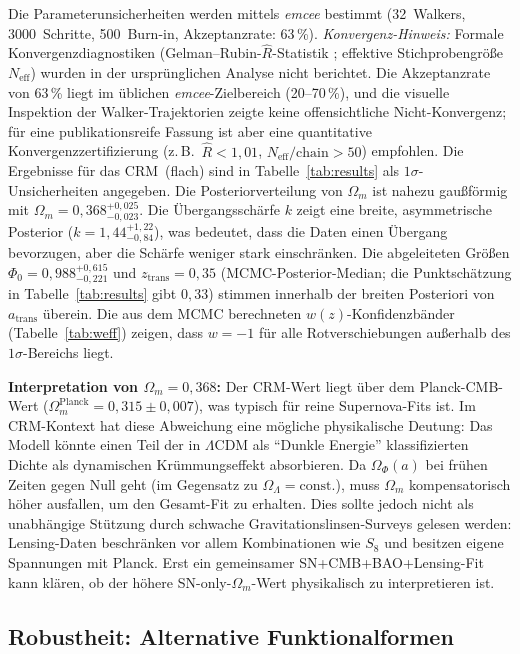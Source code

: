 \documentclass[aps,prd,twocolumn,superscriptaddress,nofootinbib]{revtex4-2}
\begin{document}
Die Parameterunsicherheiten werden mittels \textit{emcee} \cite{ForemanMackey2013} bestimmt (32~Walkers, 3000~Schritte, 500~Burn-in, Akzeptanzrate: 63\,\%). \textit{Konvergenz-Hinweis:} Formale Konvergenzdiagnostiken (Gelman--Rubin-$\hat{R}$-Statistik \cite{GelmanRubin1992}; effektive Stichprobengröße $N_\mathrm{eff}$) wurden in der ursprünglichen Analyse nicht berichtet. Die Akzeptanzrate von 63\,\% liegt im üblichen \textit{emcee}-Zielbereich (20--70\,\%), und die visuelle Inspektion der Walker-Trajektorien zeigte keine offensichtliche Nicht-Konvergenz; für eine publikationsreife Fassung ist aber eine quantitative Konvergenzzertifizierung (z.\,B.\ $\hat{R}<1{,}01$, $N_\mathrm{eff}/\mathrm{chain}>50$) empfohlen. Die Ergebnisse für das CRM~(flach) sind in Tabelle~\ref{tab:results} als $1\sigma$-Unsicherheiten angegeben. Die Posteriorverteilung von $\Omega_m$ ist nahezu gaußförmig mit $\Omega_m = 0{,}368^{+0{,}025}_{-0{,}023}$. Die Übergangsschärfe $k$ zeigt eine breite, asymmetrische Posterior ($k = 1{,}44^{+1{,}22}_{-0{,}84}$), was bedeutet, dass die Daten einen Übergang bevorzugen, aber die Schärfe weniger stark einschränken. Die abgeleiteten Größen $\Phi_0 = 0{,}988^{+0{,}615}_{-0{,}221}$ und $z_{\mathrm{trans}} = 0{,}35$ (MCMC-Posterior-Median; die Punktschätzung in Tabelle~\ref{tab:results} gibt $0{,}33$) stimmen innerhalb der breiten Posteriori von $a_{\mathrm{trans}}$ überein. Die aus dem MCMC berechneten $w(z)$-Konfidenzbänder (Tabelle~\ref{tab:weff}) zeigen, dass $w = -1$ für alle Rotverschiebungen außerhalb des $1\sigma$-Bereichs liegt.

\textbf{Interpretation von $\Omega_m = 0{,}368$:} Der CRM-Wert liegt über dem Planck-CMB-Wert ($\Omega_m^{\mathrm{Planck}} = 0{,}315 \pm 0{,}007$), was typisch für reine Supernova-Fits ist. Im CRM-Kontext hat diese Abweichung eine mögliche physikalische Deutung: Das Modell könnte einen Teil der in $\Lambda$CDM als ``Dunkle Energie'' klassifizierten Dichte als dynamischen Krümmungseffekt absorbieren. Da $\Omega_\Phi(a)$ bei frühen Zeiten gegen Null geht (im Gegensatz zu $\Omega_\Lambda = \mathrm{const.}$), muss $\Omega_m$ kompensatorisch höher ausfallen, um den Gesamt-Fit zu erhalten. Dies sollte jedoch nicht als unabhängige Stützung durch schwache Gravitationslinsen-Surveys gelesen werden: Lensing-Daten beschränken vor allem Kombinationen wie $S_8$ und besitzen eigene Spannungen mit Planck. Erst ein gemeinsamer SN+CMB+BAO+Lensing-Fit kann klären, ob der höhere SN-only-$\Omega_m$-Wert physikalisch zu interpretieren ist.

\subsection{Robustheit: Alternative Funktionalformen}
\label{subsec:funcforms}
\end{document}
